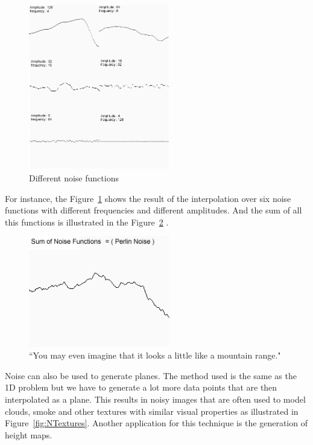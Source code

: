 \begin{figure}[htbp]
	\centering
	\includegraphics[width=0.55\textwidth]{images/Theory/Perlin_Noise/Merge.png}
	\caption{Different noise functions}
	\label{fig:merge}
\end{figure}

For instance, the Figure~\ref{fig:merge} shows the result of the interpolation over six noise functions with different frequencies and different amplitudes. And the sum of all this functions is illustrated in the Figure~\ref{fig:noise} \cite{NoisesELIAS}.

\begin{figure}[htbp]
	\centering
	\includegraphics[width=0.55\textwidth]{images/Theory/Perlin_Noise/perlin1.png}
	\caption{``You may even imagine that it looks a little like a mountain range."}
	\label{fig:noise}
\end{figure}

Noise can also be used to generate planes. The method used is the same as the 1D problem but we have to generate a lot more data points that are then interpolated as a plane. This results in noisy images that are often used to model clouds, smoke and other textures with similar visual properties as illustrated in Figure~\ref{fig:NTextures}. Another application for this technique is the generation of height maps.

